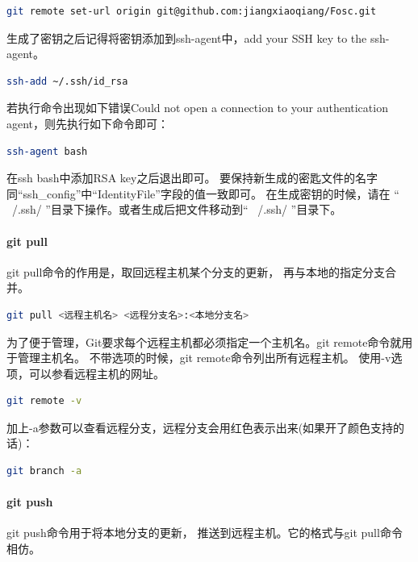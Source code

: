 \documentclass{book}
\begin{document}
\begin{lstlisting}[language=Bash]
git remote set-url origin git@github.com:jiangxiaoqiang/Fosc.git
\end{lstlisting}

生成了密钥之后记得将密钥添加到ssh-agent中，add your SSH key to the ssh-agent。

\begin{lstlisting}[language=Bash]
ssh-add ~/.ssh/id_rsa
\end{lstlisting}

若执行命令出现如下错误Could not open a connection to your authentication agent，则先执行如下命令即可：

\begin{lstlisting}[language=Bash]
ssh-agent bash
\end{lstlisting}

在ssh bash中添加RSA key之后退出即可。
要保持新生成的密匙文件的名字同“ssh\_config”中“IdentityFile”字段的值一致即可。
在生成密钥的时候，请在 “ ~/.ssh/ ”目录下操作。或者生成后把文件移动到“ ~/.ssh/ ”目录下。

\paragraph{git pull}git pull命令的作用是，取回远程主机某个分支的更新，
再与本地的指定分支合并。

\begin{lstlisting}[language=Bash]
git pull <远程主机名> <远程分支名>:<本地分支名>
\end{lstlisting}

为了便于管理，Git要求每个远程主机都必须指定一个主机名。git remote命令就用于管理主机名。
不带选项的时候，git remote命令列出所有远程主机。
使用-v选项，可以参看远程主机的网址。

\begin{lstlisting}[language=Bash]
git remote -v
\end{lstlisting}

加上-a参数可以查看远程分支，远程分支会用红色表示出来(如果开了颜色支持的话)：

\begin{lstlisting}[language=Bash]
git branch -a
\end{lstlisting}

\paragraph{git push}git push命令用于将本地分支的更新，
推送到远程主机。它的格式与git pull命令相仿。
\end{document}
